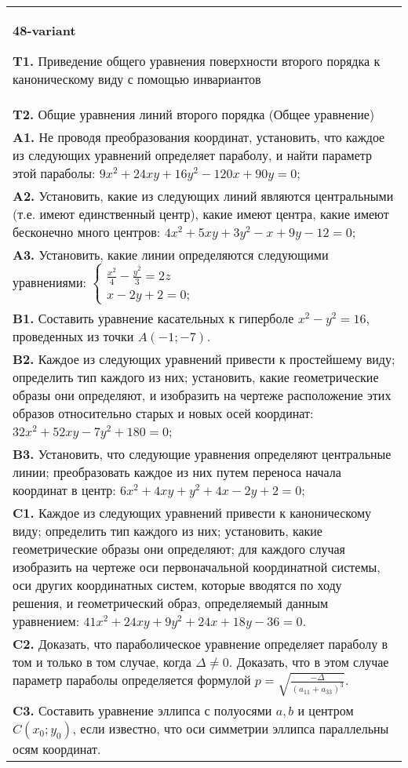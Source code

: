 \documentclass{article}
\begin{document}
\begin{tabular}{m{17cm}}
\textbf{48-variant}
\newline

\textbf{T1.} Приведение общего уравнения поверхности второго порядка к каноническому виду с помощью инвариантов \\
\textbf{T2.} Общие уравнения линий второго порядка (Общее уравнение) \\
\textbf{A1.} Не проводя преобразования координат, установить, что каждое из следующих уравнений определяет параболу, и найти параметр этой параболы: $9 x^2+24 x y+16 y^2-120 x+90 y=0$; \\
\textbf{A2.} Установить, какие из следующих линий являются центральными (т.е. имеют единственный центр), какие имеют центра, какие имеют бесконечно много центров: $4 x^2+5 x y+3 y^2-x+9 y-12=0$; \\
\textbf{A3.} Установить, какие линии определяются следующими уравнениями: $\left\{\begin{array}{l}\frac{x^2}{4}-\frac{y^2}{3}=2 z \\ x-2 y+2=0 ;\end{array}\right.$ \\
\textbf{B1.} Составить уравнение касательных к гиперболе $x^2-y^2=16$, проведенных из точки $A(-1 ;-7)$. \\
\textbf{B2.} Каждое из следующих уравнений привести к простейшему виду; определить тип каждого из них; установить, какие геометрические образы они определяют, и изобразить на чертеже расположение этих образов относительно старых и новых осей координат: $32 x^2+52 x y-7 y^2+180=0$; \\
\textbf{B3.} Установить, что следующие уравнения определяют центральные линии; преобразовать каждое из них путем переноса начала координат в центр: $6 x^2+4 x y+y^2+4 x-2 y+2=0$; \\
\textbf{C1.} Каждое из следующих уравнений привести к каноническому виду; определить тип каждого из них; установить, какие геометрические образы они определяют; для каждого случая изобразить на чертеже оси первоначальной координатной системы, оси других координатных систем, которые вводятся по ходу решения, и геометрический образ, определяемый данным уравнением: $41 x^2+24 x y+9 y^2+24 x+18 y-36=0$. \\
\textbf{C2.} Доказать, что параболическое уравнение определяет параболу в том и только в том случае, когда $\Delta \neq 0$. Доказать, что в этом случае параметр параболы определяется формулой $p=\sqrt{\frac{-\Delta}{ (a_{11}+a_{33}) ^3}}$. \\
\textbf{C3.} Составить уравнение эллипса с полуосями $a, b$ и центром $C\left(x_0 ; y_0\right)$, если известно, что оси симметрии эллипса параллельны осям координат. \\

\end{tabular}
\vspace{1cm}
\end{document}
